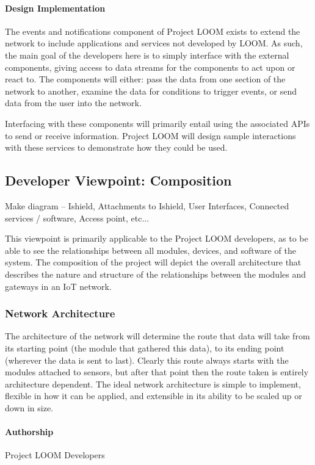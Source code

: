 \documentclass[onecolumn, draftclsnofoot,10pt, compsoc]{IEEEtran}
\begin{document}
\paragraph{Design Implementation}
    The events and notifications component of Project LOOM exists to extend the network to include applications and services not developed by LOOM. As such, the main goal of the developers here is to simply interface with the external components, giving access to data streams for the components to act upon or react to. The components will either: pass the data from one section of the network to another, examine the data for conditions to trigger events, or send data from the user into the network.

    Interfacing with these components will primarily entail using the associated APIs to send or receive information. Project LOOM will design sample interactions with these services to demonstrate how they could be used.






\subsection{Developer Viewpoint: Composition}
    Make diagram – Ishield, Attachments to Ishield, User Interfaces, Connected services / software, Access point, etc...

    This viewpoint is primarily applicable to the Project LOOM developers, as to be able to see the relationships between all modules, devices, and software of the system. The composition of the project will depict the overall architecture that describes the nature and structure of the relationships between the modules and gateways in an IoT network.

\subsubsection{Network Architecture}
    The architecture of the network will determine the route that data will take from its starting point (the module that gathered this data), to its ending point (wherever the data is sent to last). Clearly this route always starts with the modules attached to sensors, but after that point then the route taken is entirely architecture dependent. The ideal network architecture is simple to implement, flexible in how it can be applied, and extensible in its ability to be scaled up or down in size. 

\paragraph{Authorship}
    Project LOOM Developers
\end{document}
